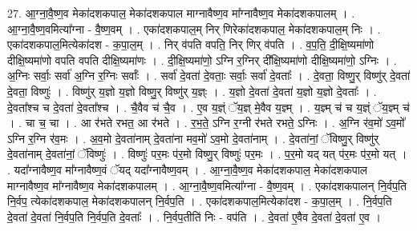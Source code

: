 \documentclass[17pt]{extarticle}
\begin{document}
27. आ॒ग्ना॒वै॒ष्ण॒व मेका॑दशकपाल॒ मेका॑दशकपाल माग्नावैष्ण॒व मा᳚ग्नावैष्ण॒व मेका॑दशकपालम् । . आ॒ग्ना॒वै॒ष्ण॒वमित्या᳚ग्ना - वै॒ष्ण॒वम् । . एका॑दशकपाल॒म् निर् णिरेका॑दशकपाल॒ मेका॑दशकपाल॒म् निः । . एका॑दशकपाल॒मित्येका॑दश - क॒पा॒ल॒म् । . निर् व॑पति वपति॒ निर् णिर् व॑पति । . व॒प॒ति॒ दी॒क्षि॒ष्यमा॑णो दीक्षि॒ष्यमा॑णो वपति वपति दीक्षि॒ष्यमा॑णः । . दी॒क्षि॒ष्यमा॑णो॒ ऽग्नि र॒ग्निर् दी᳚क्षि॒ष्यमा॑णो दीक्षि॒ष्यमा॑णो॒ ऽग्निः । . अ॒ग्निः सर्वाः॒ सर्वा॑ अ॒ग्नि र॒ग्निः सर्वाः᳚ । . सर्वा॑ दे॒वता॑ दे॒वताः॒ सर्वाः॒ सर्वा॑ दे॒वताः᳚ । . दे॒वता॒ विष्णु॒र् विष्णु॑र् दे॒वता॑ दे॒वता॒ विष्णुः॑ । . विष्णु॑र् य॒ज्ञो य॒ज्ञो विष्णु॒र् विष्णु॑र् य॒ज्ञ्ः । . य॒ज्ञो दे॒वता॑ दे॒वता॑ य॒ज्ञो य॒ज्ञो दे॒वताः᳚ । . दे॒वता᳚श्च च दे॒वता॑ दे॒वता᳚श्च । . चै॒वैव च॑ चै॒व । . ए॒व य॒ज्ञ्ं ॅय॒ज्ञ् मे॒वैव य॒ज्ञ्म् । . य॒ज्ञ्म् च॑ च य॒ज्ञ्ं ॅय॒ज्ञ्म् च॑ । . चा च॒ चा । . आ र॑भते रभत॒ आ र॑भते । . र॒भ॒ते॒ ऽग्नि र॒ग्नी र॑भते रभते॒ ऽग्निः । . अ॒ग्नि र॑व॒मो॑ ऽव॒मो᳚ ऽग्नि र॒ग्नि र॑व॒मः । . अ॒व॒मो दे॒वता॑नाम् दे॒वता॑ना मव॒मो॑ ऽव॒मो दे॒वता॑नाम् । . दे॒वता॑नां॒ ॅविष्णु॒र् विष्णु॑र् दे॒वता॑नाम् दे॒वता॑नां॒ ॅविष्णुः॑ । . विष्णुः॑ पर॒मः प॑र॒मो विष्णु॒र् विष्णुः॑ पर॒मः । . प॒र॒मो यद् यत् प॑र॒मः प॑र॒मो यत् । . यदा᳚ग्नावैष्ण॒व मा᳚ग्नावैष्ण॒वं ॅयद् यदा᳚ग्नावैष्ण॒वम् । . आ॒ग्ना॒वै॒ष्ण॒व मेका॑दशकपाल॒ मेका॑दशकपाल माग्नावैष्ण॒व मा᳚ग्नावैष्ण॒व मेका॑दशकपालम् । . आ॒ग्ना॒वै॒ष्ण॒वमित्या᳚ग्ना - वै॒ष्ण॒वम् । . एका॑दशकपालन् नि॒र्वप॒ति नि॒र्वप॒ त्येका॑दशकपाल॒ मेका॑दशकपालन् नि॒र्वप॒ति । . एका॑दशकपाल॒मित्येका॑दश - क॒पा॒ल॒म् । . नि॒र्वप॒ति दे॒वता॑ दे॒वता॑ नि॒र्वप॒ति नि॒र्वप॒ति दे॒वताः᳚ । . नि॒र्वप॒तीति॑ निः - वप॑ति । . दे॒वता॑ ए॒वैव दे॒वता॑ दे॒वता॑ ए॒व । \newline
\end{document}
